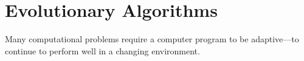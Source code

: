 
\section{Evolutionary Algorithms}
\label{sec:evolAlgorithms}

Many computational problems require a computer program to be adaptive—to continue to perform well in a
changing environment.

